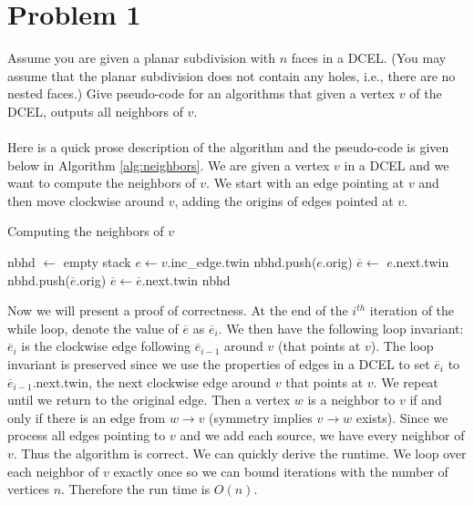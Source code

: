 \documentclass[11pt]{article}
\begin{document}

\newpage
\section*{Problem 1}

Assume you are given a planar subdivision with $n$ faces in a DCEL. (You may
assume that the planar subdivision does not contain any holes, i.e., there are
no nested faces.) Give pseudo-code for an algorithms that given a vertex $v$ of
the DCEL, outputs all neighbors of $v$. \\\\
\answer
Here is a quick prose description of the algorithm and the pseudo-code is given below in Algorithm \ref{alg:neighbors}.
We are given a vertex $v$ in a DCEL and we want to compute the neighbors of $v$.
We start with an edge pointing at $v$ and then move clockwise around $v$, adding the origins of edges pointed at $v$.

\begin{algorithm}
\caption{Computing the neighbors of $v$}
\label{alg:neighbors}
    \begin{algorithmic}[1]
        \State nbhd $\gets $ empty stack
        \State $e \gets v$.inc\_edge.twin
        \State nbhd.push($e$.orig)
        \State $\overline{e} \gets$ $e$.next.twin
            \State nbhd.push($\overline{e}$.orig)
            \State $\overline{e} \gets \overline{e}$.next.twin
        \EndWhile
        \State \Return nbhd
    \EndFunction
    \end{algorithmic}
\end{algorithm}

Now we will present a proof of correctness.
At the end of the $i^{th}$ iteration of the while loop, denote the value of $\overline{e}$ as $\overline{e}_i$.
We then have the following loop invariant: $\overline{e}_{i}$ is the clockwise edge following $\overline{e}_{i-1}$ around $v$ (that points at $v$).
The loop invariant is preserved since we use the properties of edges in a DCEL to set $\overline{e}_{i}$ to $\overline{e}_{i-1}$.next.twin, the next clockwise edge around $v$ that points at $v$.
We repeat until we return to the original edge.
Then a vertex $w$ is a neighbor to $v$ if and only if there is an edge from $w \to v$ (symmetry implies $v \to w$ exists).
Since we process all edges pointing to $v$ and we add each source, we have every neighbor of $v$.
Thus the algorithm is correct.
We can quickly derive the runtime.
We loop over each neighbor of $v$ exactly once so we can bound iterations with the number of vertices $n$.
Therefore the run time is $O(n)$.
\end{document}
